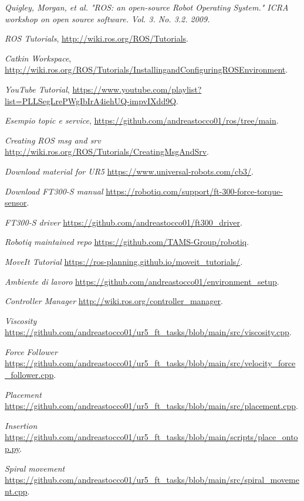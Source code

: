 \begin{thebibliography}{99}

 \textit{Quigley, Morgan, et al. "ROS: an open-source Robot Operating System." ICRA workshop on open source software. 
Vol. 3. No. 3.2. 2009.}

 \textit{ROS Tutorials}, \url{http://wiki.ros.org/ROS/Tutorials}.

 \textit{Catkin Workspace}, \url{http://wiki.ros.org/ROS/Tutorials/InstallingandConfiguringROSEnvironment}.

 \textit{YouTube Tutorial}, \url{https://www.youtube.com/playlist?list=PLLSegLrePWgIbIrA4iehUQ-impvIXdd9Q}.

 \textit{Esempio topic e service}, \url{https://github.com/andreastocco01/ros/tree/main}.

 \textit{Creating ROS msg and srv} \url{http://wiki.ros.org/ROS/Tutorials/CreatingMsgAndSrv}.

 \textit{Download material for UR5} \url{https://www.universal-robots.com/cb3/}.

 \textit{Download FT300-S manual} \url{https://robotiq.com/support/ft-300-force-torque-sensor}.

 \textit{FT300-S driver} \url{https://github.com/andreastocco01/ft300_driver}.

 \textit{Robotiq maintained repo} \url{https://github.com/TAMS-Group/robotiq}.

 \textit{MoveIt Tutorial} \url{https://ros-planning.github.io/moveit_tutorials/}.

 \textit{Ambiente di lavoro} \url{https://github.com/andreastocco01/environment_setup}.

 \textit{Controller Manager} \url{http://wiki.ros.org/controller_manager}.

 \textit{Viscosity} \url{https://github.com/andreastocco01/ur5_ft_tasks/blob/main/src/viscosity.cpp}. 

 \textit{Force Follower} \url{https://github.com/andreastocco01/ur5_ft_tasks/blob/main/src/velocity_force_follower.cpp}.

 \textit{Placement} \url{https://github.com/andreastocco01/ur5_ft_tasks/blob/main/src/placement.cpp}.

 \textit{Insertion} \url{https://github.com/andreastocco01/ur5_ft_tasks/blob/main/scripts/place_ontop.py}.

 \textit{Spiral movement} \url{https://github.com/andreastocco01/ur5_ft_tasks/blob/main/src/spiral_movement.cpp}.

\end{thebibliography}